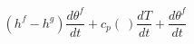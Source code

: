 \begin{equation}
(h^f-h^g) \frac{d\theta^f }{dt} + c_p(\ ) \frac{d T}{dt} +   \frac{d\theta^f }{dt}
\end{equation}